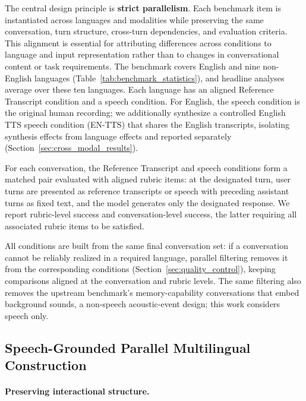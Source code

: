 \documentclass{article}
\begin{document}
    The central design principle is \textbf{strict parallelism}. Each benchmark item is instantiated across languages and modalities while preserving the same conversation, turn structure, cross-turn dependencies, and evaluation criteria. This alignment is essential for attributing differences across conditions to language and input representation rather than to changes in conversational content or task requirements. The benchmark covers English and nine non-English languages (Table~\ref{tab:benchmark_statistics}), and headline analyses average over these ten languages. Each language has an aligned Reference Transcript condition and a speech condition. For English, the speech condition is the original human recording; we additionally synthesize a controlled English TTS speech condition (EN-TTS) that shares the English transcripts, isolating synthesis effects from language effects and reported separately (Section~\ref{sec:cross_modal_results}).

    For each conversation, the Reference Transcript and speech conditions form a matched pair evaluated with aligned rubric items: at the designated turn, user turns are presented as reference transcripts or speech with preceding assistant turns as fixed text, and the model generates only the designated response. We report rubric-level success and conversation-level success, the latter requiring all associated rubric items to be satisfied.

    All conditions are built from the same final conversation set: if a conversation cannot be reliably realized in a required language, parallel filtering removes it from the corresponding conditions (Section~\ref{sec:quality_control}), keeping comparisons aligned at the conversation and rubric levels. The same filtering also removes the upstream benchmark's memory-capability conversations that embed background sounds, a non-speech acoustic-event design; this work considers speech only.


    \subsection{Speech-Grounded Parallel Multilingual Construction}
    \label{sec:benchmark_construction}

    \paragraph{Preserving interactional structure.}
    \label{sec:interaction_parsing}
    \label{sec:localization}
\end{document}
